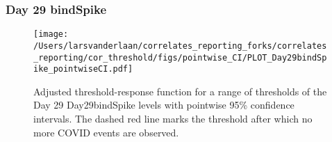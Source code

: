 \documentclass[]{article}
\begin{document}
\clearpage
\clearpage

\clearpage

\hypertarget{day-29-bindspike}{%
\subsubsection{Day 29 bindSpike}\label{day-29-bindspike}}

\begin{figure}[H]
\centering
\texttt{[image: /Users/larsvanderlaan/correlates\_reporting\_forks/correlates\_reporting/cor\_threshold/figs/pointwise\_CI/PLOT\_Day29bindSpike\_pointwiseCI.pdf]}
\caption{Adjusted threshold-response function for a range of thresholds of the
  Day 29 Day29bindSpike levels with pointwise 95\% confidence intervals. The dashed red line marks the threshold after which no more COVID events are observed. }
\end{figure}
\end{document}
